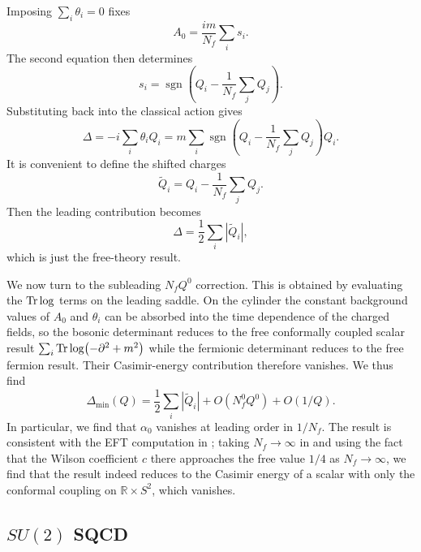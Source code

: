 \documentclass[a4paper,11pt]{article}
\newcommand\Dm{\Delta_{\min}}
\begin{document}
Imposing $\sum_i\theta_i=0$ fixes
\begin{equation}
  A_0=\frac{im}{N_f}\sum_i s_i.
\end{equation}
The second equation then determines
\begin{equation}
  s_i=\operatorname{sgn}\left(Q_i-\frac{1}{N_f}\sum_jQ_j\right).
\end{equation}
Substituting back into the classical action gives
\begin{equation}
  \Delta=-i\sum_i\theta_iQ_i =m\sum_i \operatorname{sgn}\left(Q_i-\frac{1}{N_f}\sum_jQ_j\right)Q_i.
\end{equation}
It is convenient to define the shifted charges
\begin{equation}
  \tilde Q_i = Q_i-\frac{1}{N_f}\sum_jQ_j.
\end{equation}
Then the leading contribution becomes
\begin{equation}
  \Delta = \frac12\sum_i|\tilde Q_i|,
\end{equation}
which is just the free-theory result.


We now turn to the subleading $N_fQ^0$ correction. This is obtained by evaluating the $\Tr\log$ terms on the leading saddle. On the cylinder the constant background values of $A_0$ and $\theta_i$ can be absorbed into the time dependence of the charged fields, so the bosonic determinant reduces to the free conformally coupled scalar result $\sum_i\Tr\log(-\partial^2+m^2)$ while the fermionic determinant reduces to the free fermion result. Their Casimir-energy contribution therefore vanishes. We thus find
\begin{equation}
  \Dm(Q)=\frac12 \sum_i|\tilde{Q}_i|+O(N_f^0Q^0)+O(1/Q).
\end{equation}
In particular, we find that $\alpha_0$ vanishes at leading order in $1/N_f$. The result is consistent with the EFT computation in \cite{Cuomo:2024fuy}; taking $N_f\to \infty$ in \cite{Cuomo:2024fuy} and using the fact that the Wilson coefficient $c$ there approaches the free value $1/4$ as $N_f\to\infty$, we find that the result indeed reduces to the Casimir energy of a scalar with only the conformal coupling on $\mathbb{R}\times S^2$, which vanishes.



\subsection{$SU(2)$ SQCD}\label{sec:SU2_SQCD}
\end{document}
